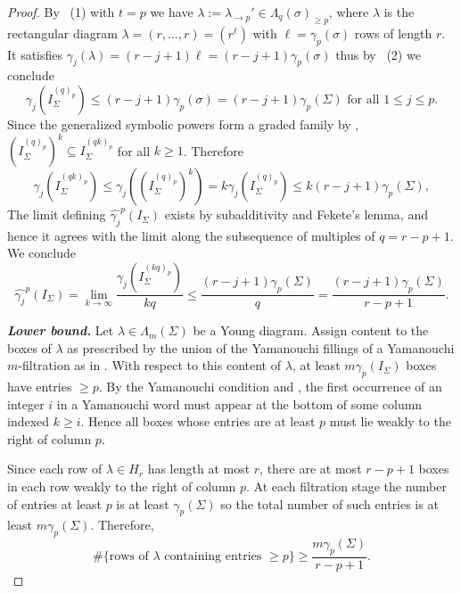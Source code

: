 \documentclass[11pt, reqno]{amsart}
\numberwithin{equation}{section}
\theoremstyle{definition}
\renewcommand{\l}{\lambda}
\newcommand{\s}{\sigma}
\begin{document}
\begin{proof}
 By ~(1)  with $t=p$ we have $\l:=\l_{\rightarrow p}'\in \Lambda_q(\s)_{\geq p}$, where $\l$  is the rectangular diagram $\l=(r,\ldots, r)=(r^\ell)$ with $\ell=\gamma_p(\s)$ rows of length $r$. It satisfies $\gamma_j\left(\l\right)=(r-j+1)\ell=(r-j+1)\gamma_p(\s)$ thus by  ~(2) we conclude
\[
\gamma_j(I_\Sigma^{(q)_p}) \le (r-j+1) \gamma_p(\s)=(r-j+1) \gamma_p(\Sigma)\text{ for all } 1\leq j\leq p.
\]
Since the generalized symbolic powers form a graded family by ,
$\left(I_\Sigma^{(q)_p}\right)^k\subseteq I_\Sigma^{(qk)_p}$
for all $k\geq 1$. Therefore
\[
\gamma_j \left(I_\Sigma^{(qk)_p}\right) \le \gamma_j \left(\left(I_\Sigma^{(q)_p}\right)^k\right)=k \gamma_j \left(I_\Sigma^{(q)_p}\right)\leq  k(r-j+1)\gamma_p(\Sigma),
\]
The limit defining $\widehat{\gamma_j}^p(I_\Sigma)$ exists by subadditivity and Fekete's lemma, and hence it agrees with the limit along the subsequence of multiples of $q=r-p+1$. We conclude
\begin{equation}\label{eq:upper}
\widehat{\gamma_j}^p(I_\Sigma)=\lim_{k\to\infty}\frac{\gamma_j(I_\Sigma^{(kq)_p})}{kq}\le \frac{(r-j+1) \gamma_p(\Sigma)}{q}
=\frac{(r-j+1)\gamma_p(\Sigma)}{r-p+1}.
\end{equation}

\medskip
\noindent
\textbf{\em Lower bound.}
Let $\lambda\in\Lambda_m(\Sigma)$ be a Young diagram.  Assign content to the  boxes of $\l$ as prescribed by the union of the Yamanouchi fillings of a Yamanouchi $m$-filtration as in . With respect  to this content of $\l$, at least $m\gamma_p(I_\Sigma)$ boxes have entries $\ge p$. By the Yamanouchi condition and \cite[Lemma~5.1]{WhiteheadThesis}, the first occurrence of an integer $i$ in a Yamanouchi word must appear at the bottom of some column indexed $k\ge i$. Hence all boxes whose entries are at least $p$ must lie  weakly to the right of column $p$.

Since each row  of $\l\in H_r$ has length at most $r$, there are at most $r-p+1$ boxes in each row weakly to the right of column $p$. At each filtration stage the number of entries at least $p$ is at least $\gamma_p(\Sigma)$ so the total number of such entries is at least $m\gamma_p(\Sigma)$. Therefore,
\begin{equation}\label{eq: rows}
\#\{\text{rows of }\lambda \text{ containing entries }\ge p\}
\ge \frac{m \gamma_p(\Sigma)}{r-p+1}.
\end{equation}


\end{proof}
\end{document}
